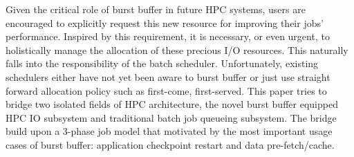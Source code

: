 

Given the critical role of burst buffer in future HPC systems,
users are encouraged to explicitly request this new resource for
improving their jobs' performance\cite{apex-workflow}.
Inspired by this requirement, it is necessary, or even urgent, to holistically manage
the allocation of these precious I/O resources.
This naturally falls into the responsibility of the batch scheduler.
Unfortunately, existing schedulers
either have not yet been aware to burst buffer\cite{Moab, Cobalt}
or just use straight forward allocation policy such as first-come, first-served\cite{SlurmBBGuide}.
This paper tries to bridge two isolated fields of HPC architecture,
the novel burst buffer equipped HPC IO subsystem and
traditional batch job queueing subsystem.
The bridge build upon a 3-phase job model that motivated by the most
important usage cases of burst buffer:
application checkpoint restart and data pre-fetch/cache.

